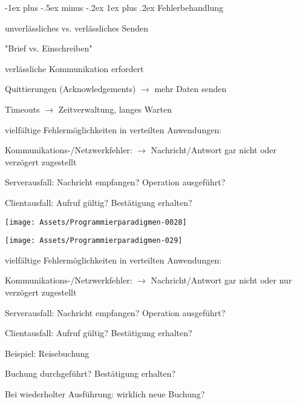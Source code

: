 \documentclass[10pt]{article}
\makeatletter
\renewcommand{\subsubsection}{\@startsection{subsubsection}{3}{0mm}%
                                {-1ex plus -.5ex minus -.2ex}%
                                {1ex plus .2ex}%
                                {\normalfont\small\bfseries}}
\makeatother
\begin{document}
\subsubsection{Fehlerbehandlung}
\begin{itemize*}
  \item unverlässliches vs. verlässliches Senden
  \begin{itemize*}
    \item "Brief vs. Einschreiben"
  \end{itemize*}
  \item verlässliche Kommunikation erfordert
  \begin{itemize*}
    \item Quittierungen (Acknowledgements) $\rightarrow$ mehr Daten senden
    \item Timeouts $\rightarrow$ Zeitverwaltung, langes Warten
  \end{itemize*}
  \item vielfältige Fehlermöglichkeiten in verteilten Anwendungen:
  \begin{itemize*}
    \item Kommunikations-/Netzwerkfehler: $\rightarrow$ Nachricht/Antwort gar nicht oder verzögert zugestellt
    \item Serverausfall: Nachricht empfangen? Operation ausgeführt?
    \item Clientausfall: Aufruf gültig? Bestätigung erhalten?
  \end{itemize*}
\end{itemize*}
\begin{center}
  \centering
  \texttt{[image: Assets/Programmierparadigmen-0028]}
\end{center}

\begin{center}
  \centering
  \texttt{[image: Assets/Programmierparadigmen-029]}
\end{center}

vielfältige Fehlermöglichkeiten in verteilten Anwendungen: 
\begin{itemize*}
  \item Kommunikations-/Netzwerkfehler: $\rightarrow$ Nachricht/Antwort gar nicht oder nur verzögert zugestellt
  \item Serverausfall: Nachricht empfangen? Operation ausgeführt?
  \item Clientausfall: Aufruf gültig? Bestätigung erhalten?
  \item Beispiel: Reisebuchung
  \begin{itemize*}
    \item Buchung durchgeführt? Bestätigung erhalten?
    \item Bei wiederholter Ausführung: wirklich neue Buchung?
  \end{itemize*}
\end{itemize*}
\end{document}
